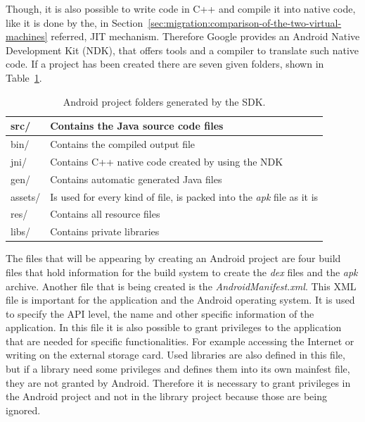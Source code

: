 Though, it is also possible to write code in C++ and compile it into native code, like it is done by the, in Section~\ref{sec:migration:comparison-of-the-two-virtual-machines} referred, JIT mechanism.
Therefore Google provides an Android Native Development Kit (NDK), that offers tools and a compiler to translate such native code.
If a project has been created there are seven given folders, shown in Table~\ref{tab:android-project-folders}.
\begin {table}[htpb] 
  \centering
\begin {tabular} {|l|l|}
	\hline
	src/&Contains the Java source code files\\
	\hline
	bin/&Contains the compiled output file\\
	\hline
	jni/&Contains C++ native code created by using the NDK\\
	\hline
	gen/&Contains automatic generated Java files\\
	\hline
	assets/&Is used for every kind of file, is packed into the \textit{apk} file as it is\\
	\hline
	res/&Contains all resource files\\
	\hline
	libs/&Contains private libraries\\
	\hline
\end {tabular}
\caption {Android project folders generated by the SDK.}
\label {tab:android-project-folders}
\end {table}

The files that will be appearing by creating an Android project are four build files that hold information for the build system to create the \textit{dex} files and the \textit{apk} archive.
Another file that is being created is the \textit{AndroidManifest.xml}.
This XML file is important for the application and the Android operating system.
It is used to specify the API level, the name and other specific information of the application.
In this file it is also possible to grant privileges to the application that are needed for specific functionalities.
For example accessing the Internet or writing on the external storage card.
Used libraries are also defined in this file, but if a library need some privileges and defines them into its own mainfest file, they are not granted by Android.
Therefore it is necessary to grant privileges in the Android project and not in the library project because those are being ignored.


